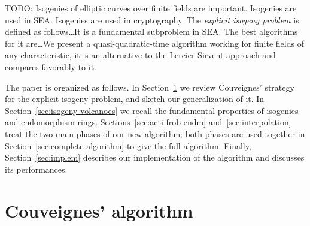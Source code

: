 \documentclass{lms}
\newcommand{\todo}[1]{{\color{red}TODO: #1}}
\begin{document}
\todo{Isogenies of elliptic curves over finite fields are
  important. Isogenies are used in SEA. Isogenies are used in
  cryptography.  The \emph{explicit isogeny problem} is defined as
  follows\dots It is a fundamental subproblem in SEA. The best
  algorithms for it are\dots We present a quasi-quadratic-time
  algorithm working for finite fields of any characteristic, it is an
  alternative to the Lercier-Sirvent approach and compares favorably
  to it.}








The paper is organized as follows. In Section~\ref{sec:couv-algor} we
review Couveignes' strategy for the explicit isogeny problem, and
sketch our generalization of it. In
Section~\ref{sec:isogeny-volcanoes} we recall the fundamental
properties of isogenies and endomorphism
rings. Sections~\ref{sec:acti-frob-endm} and~\ref{sec:interpolation}
treat the two main phases of our new algorithm; both phases are used
together in Section~\ref{sec:complete-algorithm} to give the full
algorithm. Finally, Section~\ref{sec:implem} describes our
implementation of the algorithm and discusses its performances.



\section{Couveignes' algorithm}
\label{sec:couv-algor}
\end{document}
